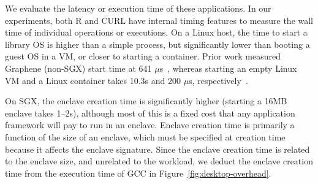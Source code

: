 We evaluate the latency or execution time of these applications. 
In our experiments, both R and CURL have internal timing features to measure the wall time
of individual operations or executions.
On a Linux host, the time to start a library OS is higher than a simple 
process, but significantly lower than booting a guest OS in a VM, or closer to
starting a container. 
Prior work measured Graphene (non-SGX) start time at 641 $\mu$s~\cite{tsai14graphene}, whereas starting an empty Linux VM and a Linux container takes 10.3s and 200 $\mu$s, respectively~\cite{agarwal15container}. 


On SGX, the enclave creation time is significantly higher (starting a 16MB enclave takes 1--2s), although most of this is a fixed cost that any application framework
will pay to run in an enclave.
Enclave creation time is primarily a function of the size of 
an enclave, which must be specified at creation time because it affects the enclave signature. %
Since the enclave creation time is related to the enclave size, and unrelated to the workload,
we deduct the enclave creation time from the execution time of GCC in Figure~\ref{fig:desktop-overhead}. 

